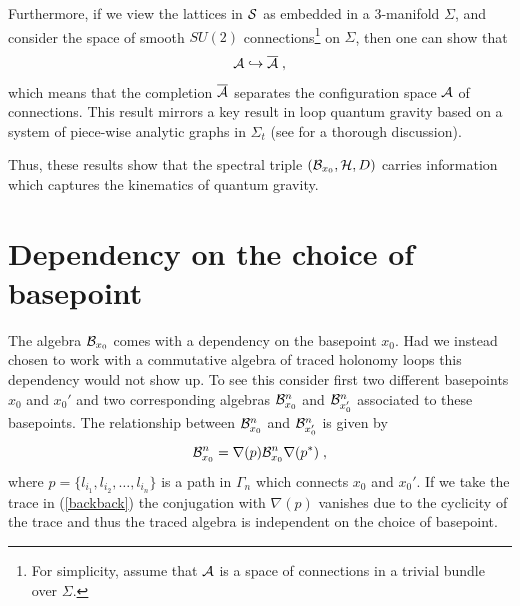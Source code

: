\documentclass[12pt]{article}
\def\G{\Gamma}
\def\ca{{\cal A}}
\def\cb{{\cal B}}
\def\ch{{\cal H}}
\def\cs{{\cal S}}
\begin{document}
Furthermore, if we view the lattices in $\cs$ as embedded in a 3-manifold $\Sigma$, and consider the space of smooth $SU(2)$ connections\footnote{For simplicity, assume that $\ca$ is a space of connections in a trivial bundle over $\Sigma$.} on $\Sigma$, then one can show that \cite{AGN2}
$$
\ca\hookrightarrow \overline{\ca}\;,
$$
which means that the completion $\overline{\ca}$ separates the configuration space $\ca$ of connections. This result mirrors a key result in loop quantum gravity based on a system of piece-wise analytic graphs in $\Sigma_t$ (see \cite{Fleischhack:2000ij} for a thorough discussion).

Thus, these results show that the spectral triple $(\cb_{x_0},\ch,D)$ carries information which captures the kinematics of quantum gravity.





\section{Dependency on the choice of basepoint}

The algebra $\cb_{x_0}$ comes with a dependency on the basepoint $x_{0}$. Had we instead chosen to work with a commutative algebra of traced holonomy loops this dependency would not show up. To see this consider first two different basepoints  $x_0$ and $x_0'$ and two corresponding algebras $\cb_{x_0}^n$ and $\cb_{x'_0}^n$ associated to these basepoints. The relationship between $\cb_{x_0}^n$ and $\cb_{x'_0}^n$ is given by
\begin{equation}
\cb_{x_0}^n = \nabla(p)   \cb_{x_0}^n \nabla(p^*)\;,
\label{backback}
\end{equation}
where $p=\{l_{i_1},l_{i_2},\ldots,l_{i_n}\}$ is a path in $\G_n$ which connects $x_0$ and $x_0'$. If we take the trace in (\ref{backback}) the conjugation with $\nabla(p)$ vanishes due to the cyclicity of the trace and thus the traced algebra is independent on the choice of basepoint. %
\end{document}
